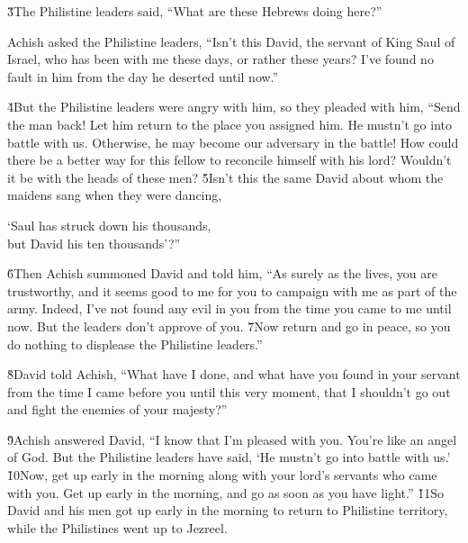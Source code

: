 \v{3}The Philistine leaders said, ``What are these Hebrews doing here?''

Achish asked the Philistine leaders, ``Isn't this David, the servant of King Saul of Israel, who has been with me these days, or rather these years? I've found no fault in him from the day he deserted until now.''

\v{4}But the Philistine leaders were angry with him, so they pleaded with him, ``Send the man back! Let him return to the place you assigned him. He mustn't go into battle with us. Otherwise, he may become our adversary in the battle! How could there be a better way for this fellow to reconcile himself with his lord? Wouldn't it be with the heads of these men? \v{5}Isn't this the same David about whom the maidens sang when they were dancing,

\begin{poetry}
\poeml `Saul has struck down his thousands, \\
\poemll    but David his ten thousands'?''
\end{poetry}

\v{6}Then Achish summoned David and told him, ``As surely as the  lives, you are trustworthy, and it seems good to me for you to campaign with me as part of the army. Indeed, I've not found any evil in you from the time you came to me until now. But the leaders don't approve of you. \v{7}Now return and go in peace, so you do nothing to displease the Philistine leaders.''

\v{8}David told Achish, ``What have I done, and what have you found in your servant from the time I came before you until this very moment, that I shouldn't go out and fight the enemies of your majesty?''

\v{9}Achish answered David, ``I know that I'm pleased with you. You're like an angel of God. But the Philistine leaders have said, `He mustn't go into battle with us.' \v{10}Now, get up early in the morning along with your lord's servants who came with you. Get up early in the morning, and go as soon as you have light.'' \v{11}So David and his men got up early in the morning to return to Philistine territory, while the Philistines went up to Jezreel.

